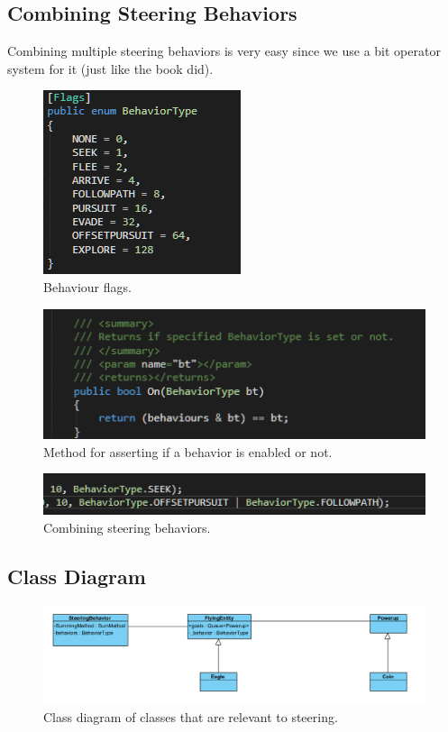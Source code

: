 \subsection{Combining Steering Behaviors}
Combining multiple steering behaviors is very easy since we use a bit operator system for it (just like the book did). 
\begin{figure}[H]
	\centering
	\includegraphics[width=0.7\linewidth]{Images/bitoperatorsflagenum}
	\caption{Behaviour flags.}
	\label{fig:behaviourflags}
\end{figure} 
\begin{figure}[H]
	\centering
	\includegraphics[width=0.7\linewidth]{Images/bitoperatorson}
	\caption{Method for asserting if a behavior is enabled or not.}
	\label{fig:offsetsource}
\end{figure} 
\begin{figure}[H]
	\centering
	\includegraphics[width=0.7\linewidth]{Images/multiplebehaviors}
	\caption{Combining steering behaviors.}
	\label{fig:multiplebehaviors}
\end{figure}

\subsection{Class Diagram}
\begin{figure}[H]
	\centering
	\includegraphics[width=0.7\linewidth]{Images/steeringclassdiagram}
	\caption{Class diagram of classes that are relevant to steering.}
	\label{fig:steeringclassdiagram}
\end{figure}